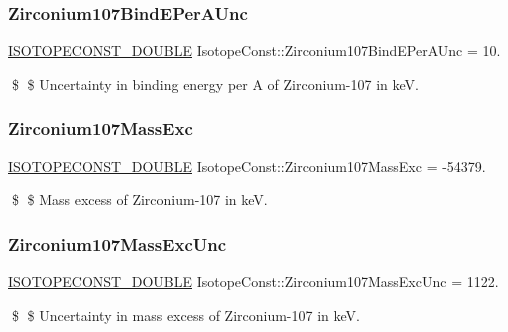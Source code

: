 \subsubsection{\texorpdfstring{Zirconium107\+Bind\+E\+Per\+A\+Unc}{Zirconium107BindEPerAUnc}}
{\footnotesize\ttfamily \mbox{\hyperlink{group___isotope_const-_macros_ga8f45a7272ce02c0b4c65c44636ed719a}{I\+S\+O\+T\+O\+P\+E\+C\+O\+N\+S\+T\+\_\+\+D\+O\+U\+B\+LE}} Isotope\+Const\+::\+Zirconium107\+Bind\+E\+Per\+A\+Unc = 10.}

\$ \$ Uncertainty in binding energy per A of Zirconium-\/107 in keV. \mbox{\label{group___isotope_const-_zirconium-_zr107_ga430d184c0e105888bea04c18df287d3b}} 
\subsubsection{\texorpdfstring{Zirconium107\+Mass\+Exc}{Zirconium107MassExc}}
{\footnotesize\ttfamily \mbox{\hyperlink{group___isotope_const-_macros_ga8f45a7272ce02c0b4c65c44636ed719a}{I\+S\+O\+T\+O\+P\+E\+C\+O\+N\+S\+T\+\_\+\+D\+O\+U\+B\+LE}} Isotope\+Const\+::\+Zirconium107\+Mass\+Exc = -\/54379.}

\$ \$ Mass excess of Zirconium-\/107 in keV. \mbox{\label{group___isotope_const-_zirconium-_zr107_gacee5e059b20b4dbe1b10d0ade1b90ac8}} 
\subsubsection{\texorpdfstring{Zirconium107\+Mass\+Exc\+Unc}{Zirconium107MassExcUnc}}
{\footnotesize\ttfamily \mbox{\hyperlink{group___isotope_const-_macros_ga8f45a7272ce02c0b4c65c44636ed719a}{I\+S\+O\+T\+O\+P\+E\+C\+O\+N\+S\+T\+\_\+\+D\+O\+U\+B\+LE}} Isotope\+Const\+::\+Zirconium107\+Mass\+Exc\+Unc = 1122.}

\$ \$ Uncertainty in mass excess of Zirconium-\/107 in keV. \mbox{\label{group___isotope_const-_zirconium-_zr107_ga930111f819fe5698640f342032a54900}} 

